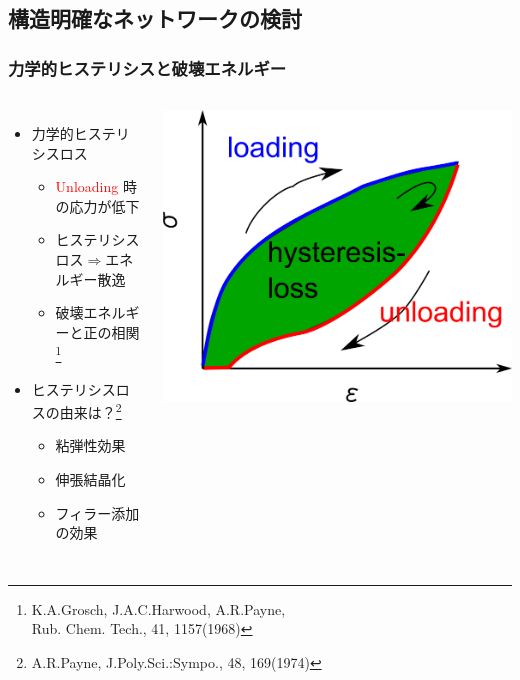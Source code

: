 \documentclass[unicode,12pt]{beamer}%
\begin{document}
\subsection{構造明確なネットワークの検討}

\begin{frame}
	\frametitle{力学的ヒステリシスと破壊エネルギー}
	\vspace{-1mm}
			\begin{columns}[T, onlytextwidth]
					\begin{itemize}
						\item 力学的ヒステリシスロス
							\begin{itemize}
								\item \textcolor{red}{Unloading} 時の応力が低下
								\item ヒステリシスロス$\Rightarrow$エネルギー散逸
								\item \alert{破壊エネルギーと正の相関}\footnote{
									\scriptsize{K.A.Grosch, J.A.C.Harwood, A.R.Payne, \\Rub. Chem. Tech., 41, 1157(1968)}
								}
							\end{itemize}
						\item ヒステリシスロスの由来は？\footnote{
							\scriptsize{A.R.Payne, J.Poly.Sci.:Sympo., 48, 169(1974)}
						}
						\begin{itemize}
							\item \alert{粘弾性効果}
							\item 伸張結晶化
							\item フィラー添加の効果
						\end{itemize}
					\end{itemize}
				\begin{center}
					\vspace{-2mm}
					\includegraphics[width=\textwidth]{hysteresis_curve.png}


\end{center}
\end{columns}
\end{frame}
\end{document}
